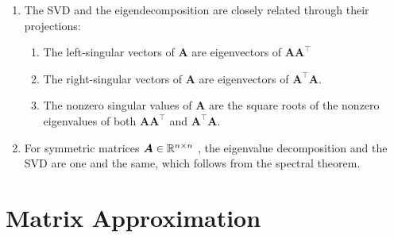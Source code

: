 \begin{enumerate}
    \item The SVD and the eigendecomposition are closely related through their projections:
    \hfill \cite{mfml/book/mml/Deisenroth-Faisal-Ong}
    \begin{enumerate}
        \item The left-singular vectors of $\bm{A}$ are eigenvectors of $\bm{AA}^\top$
        \hfill \cite{mfml/book/mml/Deisenroth-Faisal-Ong}

        \item The right-singular vectors of $\bm{A}$ are eigenvectors of $\bm{A}^\top \bm{A}$.
        \hfill \cite{mfml/book/mml/Deisenroth-Faisal-Ong}

        \item The nonzero singular values of $\bm{A}$ are the square roots of the nonzero eigenvalues of both $\bm{AA}^\top$ and $\bm{A} ^\top \bm{A}$.
        \hfill \cite{mfml/book/mml/Deisenroth-Faisal-Ong}
    \end{enumerate}

    \item For symmetric matrices $\bm{A} \in \mathbb{R}^{n\times n}$ , the eigenvalue decomposition and the SVD are one and the same, which follows from the spectral theorem.
    \hfill \cite{mfml/book/mml/Deisenroth-Faisal-Ong}
\end{enumerate}






\section{Matrix Approximation}

